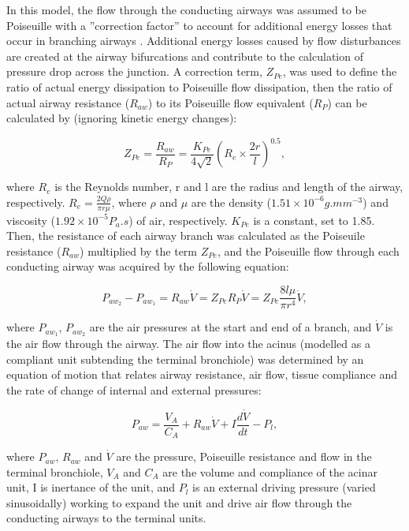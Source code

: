 In this model, the flow through the conducting airways was assumed to be Poiseuille with a ''correction factor'' to account for additional energy losses that occur in branching airways \citep{pedley1970energy}. Additional energy losses caused by flow disturbances are created at the airway bifurcations and contribute to the calculation of pressure drop across the junction. A correction term, $Z_{Pe}$, was used to define the ratio of actual energy dissipation to Poiseuille flow dissipation, then the ratio of actual airway resistance ($R_{aw}$) to its Poiseuille flow equivalent ($R_P$) can be calculated by (ignoring kinetic energy changes):

\begin{equation}
 \label{eq:EnergyDissipation}
 Z_{Pe} = \frac{R_{aw}}{R_P} = \frac{K_{Pe}}{4\sqrt{2}}(R_e \times \frac{2r}{l})^{0.5},
\end{equation}

\noindent where $R_e$ is the Reynolds number, r and l are the radius and length of the airway, respectively. $R_e = \frac{2Q\rho}{\pi r \mu}$, where $\rho$ and $\mu$ are the density ($1.51 \times 10^{-6}g.mm^{-3}$) and viscosity ($1.92 \times 10^{-5}P_{a}.s$) of air, respectively. $K_{Pe}$ is a constant, set to 1.85. Then, the resistance of each airway branch was calculated as the Poiseuile resistance ($R_{aw}$) multiplied by the term $Z_{Pe}$, and the Poiseuille flow through each conducting airway was acquired by the following equation:

\begin{equation}
 \label{eq:PressureFlowEquation}
 P_{aw_2} - P_{aw_1} = R_{aw}\dot{V} = Z_{Pe}R_P\dot{V} = Z_{Pe}\frac{8l\mu}{\pi r^{4}}\dot{V},
\end{equation}

\noindent where $P_{aw_1}$, $P_{aw_2}$ are the air pressures at the start and end of a branch, and $\dot{V}$ is the air flow through the airway. The air flow into the acinus (modelled as a compliant unit subtending the terminal bronchiole) was determined by an equation of motion that relates airway resistance, air flow, tissue compliance and the rate of change of internal and external pressures:

\begin{equation}
 \label{eq:AcinarFlowEquation}
 P_{aw} = \frac{V_A}{C_A} + R_{aw}\dot{V} + I\frac{d\dot{V}}{dt} - P_l,
\end{equation}

\noindent where $P_{aw}$, $R_{aw}$ and $\dot{V}$ are the pressure, Poiseuille resistance and flow in the terminal bronchiole, $V_A$ and $C_A$ are the volume and compliance of the acinar unit, I is inertance of the unit, and $P_l$ is an external driving pressure (varied sinusoidally) working to expand the unit and drive air flow through the conducting airways to the terminal units.

